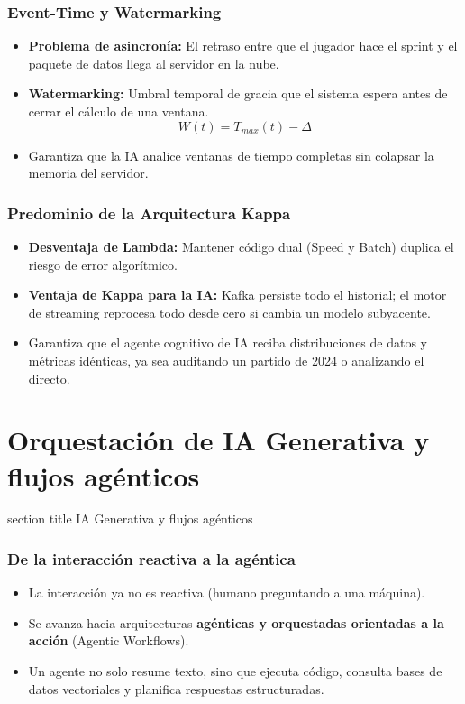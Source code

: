 \documentclass[aspectratio=169]{beamer}
\newcommand{\sectionpagetitle}[1]{
\begin{frame}
	\vspace{1cm}
	\begin{beamercolorbox}[sep=8pt,center,wd=\textwidth]{section title}
		\usebeamerfont{section title}#1\par
	\end{beamercolorbox}
\end{frame}
}
\begin{document}
\begin{frame}\frametitle{Event-Time y Watermarking}
\begin{itemize}
    \item \textbf{Problema de asincronía:} El retraso entre que el jugador hace el sprint y el paquete de datos llega al servidor en la nube.
    \item \textbf{Watermarking:} Umbral temporal de gracia que el sistema espera antes de cerrar el cálculo de una ventana.
    \[
    W(t) = T_{max}(t) - \Delta
    \]
    \item Garantiza que la IA analice ventanas de tiempo completas sin colapsar la memoria del servidor.
\end{itemize}
\end{frame}

\begin{frame}\frametitle{Predominio de la Arquitectura Kappa}
\begin{itemize}
    \item \textbf{Desventaja de Lambda:} Mantener código dual (Speed y Batch) duplica el riesgo de error algorítmico.
    \item \textbf{Ventaja de Kappa para la IA:} Kafka persiste todo el historial; el motor de streaming reprocesa todo desde cero si cambia un modelo subyacente.
    \item Garantiza que el agente cognitivo de IA reciba distribuciones de datos y métricas idénticas, ya sea auditando un partido de 2024 o analizando el directo.
\end{itemize}
\end{frame}

\section{Orquestación de IA Generativa y flujos agénticos}
\sectionpagetitle{IA Generativa y flujos agénticos}

\begin{frame}\frametitle{De la interacción reactiva a la agéntica}
\begin{itemize}
    \item La interacción ya no es reactiva (humano preguntando a una máquina).
    \item Se avanza hacia arquitecturas \textbf{agénticas y orquestadas orientadas a la acción} (Agentic Workflows).
    \item Un agente no solo resume texto, sino que ejecuta código, consulta bases de datos vectoriales y planifica respuestas estructuradas.
\end{itemize}
\end{frame}
\end{document}
